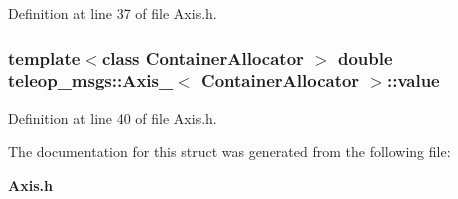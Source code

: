 Definition at line 37 of file Axis.h.

\subsubsection[{value}]{\setlength{\rightskip}{0pt plus 5cm}template$<$class ContainerAllocator $>$ double {\bf teleop\_\-msgs::Axis\_\-}$<$ ContainerAllocator $>$::{\bf value}}\label{structteleop__msgs_1_1Axis___a9196387fde565d8e9bc7a68cef2934b2}


Definition at line 40 of file Axis.h.



The documentation for this struct was generated from the following file:\begin{DoxyCompactItemize}
\item 
{\bf Axis.h}\end{DoxyCompactItemize}
